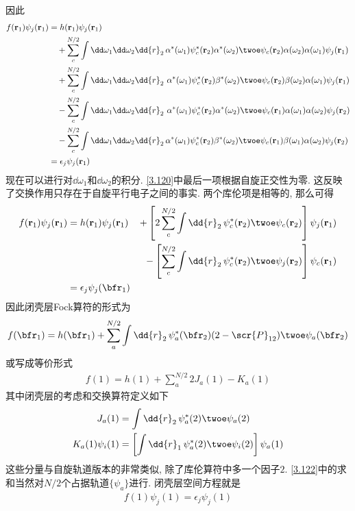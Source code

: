因此
\begin{align}
	f(\mathbf{r}_1)\psi_j(\mathbf{r}_1) & = h(\mathbf{r}_1)\psi_j(\mathbf{r}_1)\notag\\
	& {}\quad + \sum_c^{N/2}\int\dd\omega_1\dd\omega_2\dd{r}_2\,\alpha^*(\omega_1)\psi_c^*(\mathbf{r}_2)\alpha^*(\omega_2)\twoe\psi_c(\mathbf{r}_2)\alpha(\omega_2)\alpha(\omega_1)\psi_j(\mathbf{r}_1)\notag\\
	& {}\quad + \sum_c^{N/2}\int\dd\omega_1\dd\omega_2\dd{r}_2\,\,\alpha^*(\omega_1)\psi_c^*(\mathbf{r}_2)\beta^*(\omega_2)\twoe\psi_c(\mathbf{r}_2)\beta(\omega_2)\alpha(\omega_1)\psi_j(\mathbf{r}_1)\notag\\
	& {}\quad - \sum_c^{N/2}\int\dd\omega_1\dd\omega_2\dd{r}_2\,\,\alpha^*(\omega_1)\psi_c^*(\mathbf{r}_2)\alpha^*(\omega_2)\twoe\psi_c(\mathbf{r}_1)\alpha(\omega_1)\alpha(\omega_2)\psi_j(\mathbf{r}_2)\notag\\
	& {}\quad - \sum_c^{N/2}\int\dd\omega_1\dd\omega_2\dd{r}_2\,\alpha^*(\omega_1)\psi_c^*(\mathbf{r}_2)\beta^*(\omega_2)\twoe\psi_c(\mathbf{r}_1)\beta(\omega_1)\alpha(\omega_2)\psi_j(\mathbf{r}_2)\notag\\
	& = \epsilon_j\psi_j(\mathbf{r}_1)
	\label{3.120}
\end{align}
现在可以进行对$\dd\omega_1$和$\dd\omega_2$的积分. 
\autoref{3.120}中最后一项根据自旋正交性为零. 
这反映了交换作用只存在于自旋平行电子之间的事实. 
两个库伦项是相等的, 
那么可得
\begin{alignat}{3}
	f(\mathbf{r}_1)\psi_j(\mathbf{r}_1) 
	& = h(\mathbf{r}_1)\psi_j(\mathbf{r}_1) & + \left[ 2\sum_c^{N/2}\int\dd{r}_2\,\psi_c^*(\mathbf{r}_2)\twoe\psi_c(\mathbf{r}_2)\right]\psi_j(\mathbf{r}_1)\notag\\
	&                                       & - \left[  \sum_c^{N/2}\int\dd{r}_2\,\psi_c^*(\mathbf{r}_2)\twoe\psi_j(\mathbf{r}_2)\right]\psi_c(\mathbf{r}_1)\notag\\
	& = \epsilon_j\psi_j(\bfr_1)&
\end{alignat}
因此闭壳层Fock算符的形式为
\begin{align}
	\label{3.122}
	f(\bfr_1) = h(\bfr_1) + \sum_a^{N/2}\int\dd{r}_2\,\psi_a^*(\bfr_2)(2-\scr{P}_{12})\twoe\psi_a(\bfr_2)
\end{align}
或写成等价形式
\begin{align}
	f(1) = h(1) + \sum_a^{N/2} 2J_a(1) - K_a(1)
\end{align}
其中闭壳层的考虑和交换算符定义如下
\begin{align}
	J_a(1) & = \int\dd{r}_2\,\psi_a^*(2)\twoe\psi_a(2) \label{3.124}\\
	K_a(1) \psi_i(1) & = \left[ \int\dd{r}_1\,\psi_a^*(2)\twoe\psi_i(2) \right]\psi_a(1) \label{3.125}
\end{align}
这些分量与自旋轨道版本的非常类似, 
除了库伦算符中多一个因子$2$. 
\autoref{3.122}中的求和当然对$N/2$个占据轨道$\{\psi_a\}$进行. 
闭壳层空间\hft 方程就是
\begin{align}
	f(1)\psi_j(1) = \epsilon_j\psi_j(1)
\end{align}

